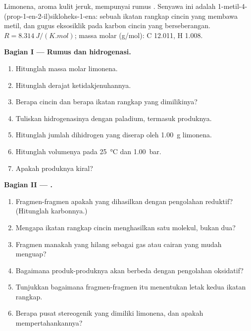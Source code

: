 \begin{problem}
\label{pb:b2:alkene-redox:1}
Limonena, aroma kulit jeruk, mempunyai rumus . Senyawa ini adalah
1-metil-4-(prop-1-en-2-il)sikloheks-1-ena: sebuah ikatan rangkap cincin yang
membawa metil, dan gugus eksosiklik  pada karbon cincin yang
berseberangan. $R =
\qty{8.314}{J/(K.mol)}$; massa molar (\unit{g/mol}): C 12.011, H 1.008.

\medskip
\noindent\textbf{Bagian I --- Rumus dan hidrogenasi.}
\begin{enumerate}
  \item Hitunglah massa molar limonena.
  \item Hitunglah derajat ketidakjenuhannya.
  \item Berapa cincin dan berapa ikatan rangkap yang dimilikinya?
  \item Tuliskan hidrogenasinya dengan paladium, termasuk produknya.
  \item Hitunglah jumlah dihidrogen yang diserap oleh \qty{1.00}{g} limonena.
  \item Hitunglah volumenya pada \qty{25}{\degreeCelsius} dan \qty{1.00}{bar}.
  \item Apakah produknya kiral?
\end{enumerate}

\medskip
\noindent\textbf{Bagian II --- .}
\begin{enumerate}[resume]
  \item Fragmen-fragmen apakah yang dihasilkan  dengan pengolahan
        reduktif? (Hitunglah karbonnya.)
  \item Mengapa ikatan rangkap cincin menghasilkan satu molekul, bukan dua?
  \item Fragmen manakah yang hilang sebagai gas atau cairan yang mudah menguap?
  \item Bagaimana produk-produknya akan berbeda dengan pengolahan oksidatif?
  \item Tunjukkan bagaimana fragmen-fragmen itu menentukan letak kedua ikatan rangkap.
  \item Berapa pusat stereogenik yang dimiliki limonena, dan apakah 
        mempertahankannya?
\end{enumerate}


\end{problem}
